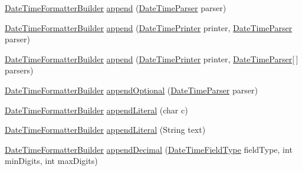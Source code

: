 \begin{DoxyCompactItemize}
\item 
\hyperlink{classorg_1_1joda_1_1time_1_1format_1_1_date_time_formatter_builder}{Date\-Time\-Formatter\-Builder} \hyperlink{classorg_1_1joda_1_1time_1_1format_1_1_date_time_formatter_builder_a67d2b77e135c36de51546f6e2a1fa5df}{append} (\hyperlink{interfaceorg_1_1joda_1_1time_1_1format_1_1_date_time_parser}{Date\-Time\-Parser} parser)
\item 
\hyperlink{classorg_1_1joda_1_1time_1_1format_1_1_date_time_formatter_builder}{Date\-Time\-Formatter\-Builder} \hyperlink{classorg_1_1joda_1_1time_1_1format_1_1_date_time_formatter_builder_a810c635297187d24931e45ec0c96c1ad}{append} (\hyperlink{interfaceorg_1_1joda_1_1time_1_1format_1_1_date_time_printer}{Date\-Time\-Printer} printer, \hyperlink{interfaceorg_1_1joda_1_1time_1_1format_1_1_date_time_parser}{Date\-Time\-Parser} parser)
\item 
\hyperlink{classorg_1_1joda_1_1time_1_1format_1_1_date_time_formatter_builder}{Date\-Time\-Formatter\-Builder} \hyperlink{classorg_1_1joda_1_1time_1_1format_1_1_date_time_formatter_builder_a4f082a8529cf656ebc9f4cdb505229dc}{append} (\hyperlink{interfaceorg_1_1joda_1_1time_1_1format_1_1_date_time_printer}{Date\-Time\-Printer} printer, \hyperlink{interfaceorg_1_1joda_1_1time_1_1format_1_1_date_time_parser}{Date\-Time\-Parser}\mbox{[}$\,$\mbox{]} parsers)
\item 
\hyperlink{classorg_1_1joda_1_1time_1_1format_1_1_date_time_formatter_builder}{Date\-Time\-Formatter\-Builder} \hyperlink{classorg_1_1joda_1_1time_1_1format_1_1_date_time_formatter_builder_a6b8891078ab9e282a76fb4c4e889af4d}{append\-Optional} (\hyperlink{interfaceorg_1_1joda_1_1time_1_1format_1_1_date_time_parser}{Date\-Time\-Parser} parser)
\item 
\hyperlink{classorg_1_1joda_1_1time_1_1format_1_1_date_time_formatter_builder}{Date\-Time\-Formatter\-Builder} \hyperlink{classorg_1_1joda_1_1time_1_1format_1_1_date_time_formatter_builder_ad3a1b727c83f19ab0105ce2f0b9c57ee}{append\-Literal} (char c)
\item 
\hyperlink{classorg_1_1joda_1_1time_1_1format_1_1_date_time_formatter_builder}{Date\-Time\-Formatter\-Builder} \hyperlink{classorg_1_1joda_1_1time_1_1format_1_1_date_time_formatter_builder_ac43e38abf9b23abc1cb3178753ec0390}{append\-Literal} (String text)
\item 
\hyperlink{classorg_1_1joda_1_1time_1_1format_1_1_date_time_formatter_builder}{Date\-Time\-Formatter\-Builder} \hyperlink{classorg_1_1joda_1_1time_1_1format_1_1_date_time_formatter_builder_af55cbb12655e60cdab22dc2b84f9fe51}{append\-Decimal} (\hyperlink{classorg_1_1joda_1_1time_1_1_date_time_field_type}{Date\-Time\-Field\-Type} field\-Type, int min\-Digits, int max\-Digits)

\end{DoxyCompactItemize}
